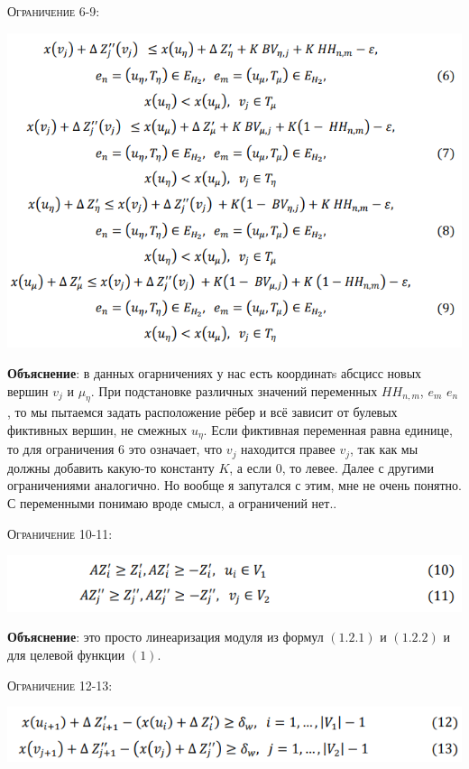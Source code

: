 \documentclass[%
10pt, %
final, %
oneside, %
onecolumn, %
centertags]{article} %
\theoremstyle{plain}
\theoremstyle{definition}
\theoremstyle{remark}
\begin{document}
\textsc{Ограничение 6-9:}
\begin{center}
	\includegraphics[scale=0.6]{2.69.png}
\end{center}

\textbf{Объяснение}: в данных огарничениях у нас есть координатs абсцисс новых вершин $v_j$ и $\mu_{\eta}$. При подстановке различных значений переменных $HH_{n, m}$,  $e_m$  $e_n$, то мы пытаемся задать расположение рёбер и всё зависит от булевых фиктивных вершин, не смежных $u_{\eta}$. Если фиктивная переменная равна единице, то для ограничения $6$ это означает, что $v_j$ находится правее $v_j$, так как мы должны добавить какую-то константу $K$, а если $0$, то левее. Далее с другими ограничениями аналогично. Но вообще я запутался с этим, мне не очень понятно. С переменными понимаю вроде смысл, а ограничений нет..

\textsc{Ограничение 10-11:}
\begin{center}
	\includegraphics[scale=0.6]{2.1011.png}
\end{center}

\textbf{Объяснение}: это просто линеаризация модуля из формул $(1.2.1)$ и $(1.2.2)$ и для целевой функции $(1)$.

\textsc{Ограничение 12-13:}
\begin{center}
	\includegraphics[scale=0.6]{2.1213.png}
\end{center}
\end{document}
